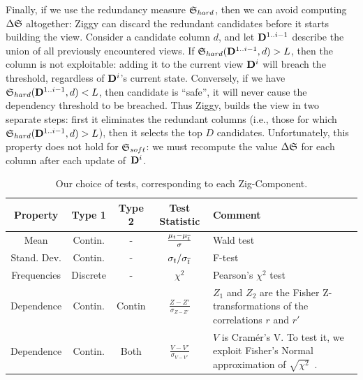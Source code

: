 Finally, if we use the redundancy measure $\mathfrak{S}_{hard}$, then we can avoid
computing $ \Delta\mathfrak{S}$ altogether: Ziggy can discard the redundant
candidates before it starts building the view.  Consider a candidate column
$d$, and let $\mathbf{D}^{1..i-1}$ describe the union of all previously encountered
views. If $\mathfrak{S}_{hard} (\mathbf{D}^{1..i-1}, d) > L$, then the column is not
exploitable: adding it to the current view $\mathbf{D}^{i}$ will breach the
threshold, regardless of $\mathbf{D}^{i}$'s current state.  Conversely, if we have
$\mathfrak{S}_{hard}(\mathbf{D}^{1..i-1}, d) < L$, then candidate is ``safe'', it will
never cause the dependency threshold to be breached.  Thus Ziggy, builds the
view in two separate steps: first it eliminates the redundant columns (i.e.,
those for which $\mathfrak{S}_{hard} (\mathbf{D}^{1..i-1}, d) > L$), then it selects the
top $D$ candidates.  Unfortunately, this property does not hold for
$\mathfrak{S}_{soft}$: we must recompute the value $\Delta\mathfrak{S}$ for each column
after each update of~$\mathbf{D}^{i}$.
\begin{table}[t!]
    \centering
    \begin{tabular}{c c c c p{9.5cm}}
      \hline
      Property & Type 1 & Type 2 & Test Statistic & Comment\\
      \hline
      Mean & Contin.  & - & $\frac{\mu_t - \mu_{\overline{t}}}{\sigma}$ &
        Wald test~\cite{wasserman2013all}  \\
        Stand. Dev.& Contin.  & - & $\sigma_t / \sigma_{\overline{t}}$ &
        F-test~\cite{wasserman2013all} \\
        Frequencies & Discrete & - & $\chi^2$ & Pearson's $\chi^2$
        test~\cite{wasserman2013all}\\
      \hline
      Dependence  & Contin. & Contin & $\frac{Z - Z'}{\sigma_{Z - Z'}}$ & $Z_1$
      and $Z_2$ are the Fisher Z-transformations of the correlations $r$ and
      $r'$~\cite{fisher1915frequency}  \\
      Dependence  & Contin. & Both &  $\frac{V-V'}{\sigma_{V-V'}}$ & $V$ is
      Cram\'er's V. To test it, we exploit Fisher's
      Normal approximation of $\sqrt{\chi^2}$~\cite{patel1996handbook}.\\ 
      \hline
    \end{tabular}
\caption{Our choice of tests, corresponding to each Zig-Component.}
    \label{tab:tests}
\end{table}
